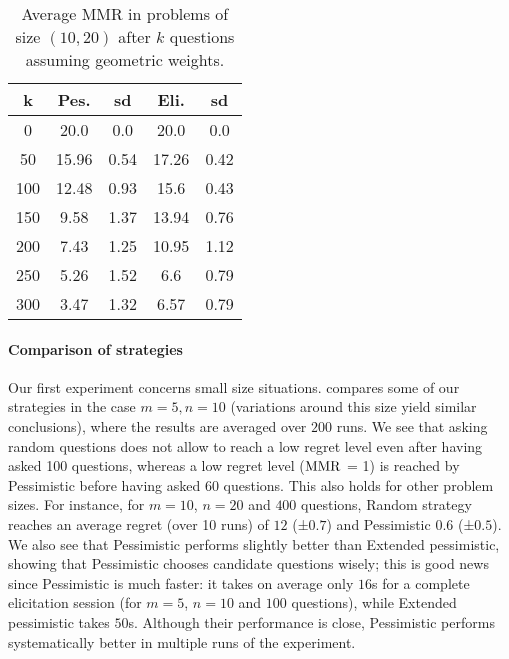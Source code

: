 \documentclass{article}
\begin{document}
\begin{table}
	\caption{Average MMR in problems of size $(10, 20)$ after $k$ questions assuming geometric weights.}
	\label{tab:geometricWeights}
	\begin{tabular}{S[table-figures-integer=3, table-figures-decimal=0]S[table-number-alignment = right]@{ ± }S[table-number-alignment = left, table-figures-integer=1]S[table-number-alignment = right]@{ ± }S[table-number-alignment = left, table-figures-integer=1]}
		\toprule
		{k} & {Pes.} & {sd} & {Eli.} & {sd} \\
			&20.0	&0.0	&20.0	&0.0\\
		50	&15.96	&0.54	&17.26	&0.42\\
		100	&12.48	&0.93	&15.6	&0.43\\
		150	&9.58	&1.37	&13.94	&0.76\\
		200	&7.43	&1.25	&10.95	&1.12\\
		250	&5.26	&1.52	&6.6	&0.79\\
		300	&3.47	&1.32	&6.57	&0.79\\
		\bottomrule
	\end{tabular}
\end{table}
\paragraph{Comparison of strategies}
Our first experiment concerns small size situations.
 compares some of our strategies in the case $m = 5, n = 10$ (variations around this size yield similar conclusions), where the results are averaged over $200$ runs.
We see that asking random questions does not allow to reach a low regret level even after having asked 100 questions, whereas a low regret level ($\operatorname{MMR}$ = 1) is reached by Pessimistic before having asked 60 questions. This also holds for other problem sizes. For instance, for $m =10$, $n = 20$ and $400$ questions, Random strategy reaches an average regret (over 10 runs) of $12$ (±$ 0.7$) and Pessimistic $0.6$ (±$ 0.5$).
We also see that Pessimistic performs slightly better than Extended pessimistic, showing that Pessimistic chooses candidate questions wisely; this is good news since Pessimistic is much faster: it takes on average only $16$s for a complete elicitation session (for $m = 5$, $n = 10$ and $100$ questions), while Extended pessimistic takes $50$s. Although their performance is close, Pessimistic performs systematically better in multiple runs of the experiment.
\end{document}
